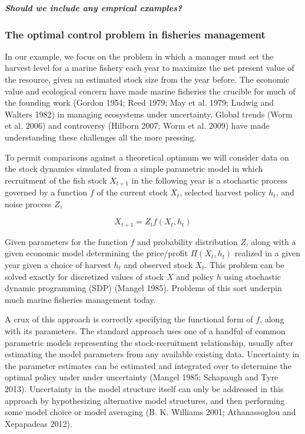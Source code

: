 \documentclass[author-year, review]{elsarticle} %
\begin{document}
\textbf{\emph{Should we include any emprical examples?}}

\subsubsection{The optimal control problem in fisheries management}

In our example, we focus on the problem in which a manager must set the
harvest level for a marine fishery each year to maximize the net present
value of the resource, given an estimated stock size from the year
before. The economic value and ecological concern have made marine
fisheries the crucible for much of the founding work (Gordon 1954; Reed
1979; May et al. 1979; Ludwig and Walters 1982) in managing ecosystems
under uncertainty. Global trends (Worm et al. 2006) and controversy
(Hilborn 2007; Worm et al. 2009) have made understanding these
challenges all the more pressing.

To permit comparisons against a theoretical optimum we will consider
data on the stock dynamics simulated from a simple parametric model in
which recruitment of the fish stock $X_{t+1}$ in the following year is a
stochastic process governed by a function $f$ of the current stock
$X_t$, selected harvest policy $h_t$, and noise process $Z$,

\[X_{t+1} = Z_t f(X_t, h_t) \]

Given parameters for the function $f$ and probability distribution $Z$,
along with a given economic model determining the price/profit
$\Pi(X_t, h_t)$ realized in a given year given a choice of harvest $h_t$
and observed stock $X_t$. This problem can be solved exactly for
discretized values of stock $X$ and policy $h$ using stochastic dynamic
programming (SDP) (Mangel 1985). Problems of this sort underpin much
marine fisheries management today.

A crux of this approach is correctly specifying the functional form of
$f$, along with its parameters. The standard approach uses one of a
handful of common parametric models representing the stock-recruitment
relationship, usually after estimating the model parameters from any
available existing data. Uncertainty in the parameter estimates can be
estimated and integrated over to determine the optimal policy under
under uncertainty (Mangel 1985; Schapaugh and Tyre 2013). Uncertainty in
the model structure itself can only be addressed in this approach by
hypothesizing alternative model structures, and then performing some
model choice or model averaging (B. K. Williams 2001; Athanassoglou and
Xepapadeas 2012).
\end{document}
